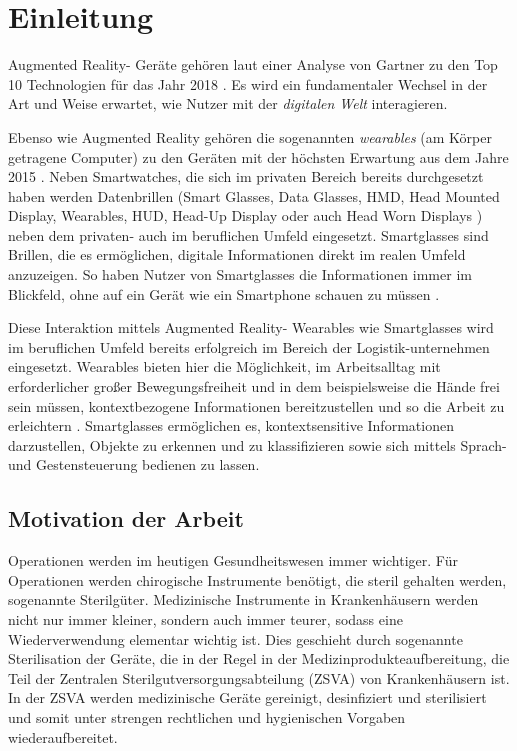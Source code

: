 
\chapter{Einleitung}
Augmented Reality- Geräte gehören laut einer Analyse von Gartner zu den Top 10 Technologien für das Jahr 2018 \cite{Panetta2017a}. Es wird ein fundamentaler Wechsel in der Art und Weise erwartet, wie Nutzer mit der \emph{digitalen Welt} interagieren. 

Ebenso wie Augmented Reality gehören die sogenannten \emph{wearables} (am Körper getragene Computer) zu den Geräten mit der höchsten Erwartung aus dem Jahre 2015 \cite{Levy2015Whats2015}. Neben Smartwatches, die sich im privaten Bereich bereits durchgesetzt haben \cite{statistaSmartwatches2014-2018}
werden Datenbrillen (Smart Glasses, Data Glasses, HMD, Head Mounted Display, Wearables, HUD, Head-Up Display oder auch Head Worn Displays \cite{Zobel2016AugmentedGlasses}) neben dem privaten- auch im beruflichen Umfeld eingesetzt. Smartglasses sind Brillen, die es ermöglichen, digitale Informationen direkt im realen Umfeld anzuzeigen. So haben Nutzer von Smartglasses die Informationen immer im Blickfeld, ohne auf ein Gerät wie ein Smartphone schauen zu müssen \cite{Due2014Glasses}.

Diese Interaktion mittels Augmented Reality- Wearables wie Smartglasses wird im beruflichen Umfeld bereits erfolgreich im Bereich der Logistik-unternehmen eingesetzt. Wearables bieten hier die Möglichkeit, im Arbeitsalltag mit erforderlicher großer Bewegungsfreiheit und in dem beispielsweise die Hände frei sein müssen, kontextbezogene Informationen bereitzustellen und so die Arbeit zu erleichtern \cite{Zobel2016AugmentedGlasses}. Smartglasses ermöglichen es, kontextsensitive Informationen darzustellen, Objekte zu erkennen und zu klassifizieren sowie sich mittels Sprach- und Gestensteuerung bedienen zu lassen.
%
%
\section{Motivation der Arbeit}
Operationen werden im heutigen Gesundheitswesen immer wichtiger. Für Operationen werden chirogische Instrumente benötigt, die steril gehalten werden, sogenannte Sterilgüter.
Medizinische Instrumente in Krankenhäusern werden nicht nur immer kleiner, sondern auch immer teurer, sodass eine Wiederverwendung elementar wichtig ist. Dies geschieht durch sogenannte Sterilisation der Geräte, die in der Regel in der Medizinprodukteaufbereitung, die Teil der Zentralen Sterilgutversorgungsabteilung (ZSVA) von Krankenhäusern ist. In der ZSVA werden medizinische Geräte gereinigt, desinfiziert und sterilisiert und somit unter strengen rechtlichen und hygienischen Vorgaben wiederaufbereitet. 

